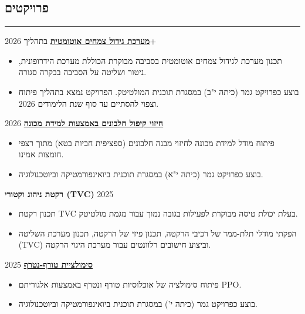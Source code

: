 \documentclass[11pt, a4paper]{article}
\begin{document}
\begin{hebrew}
\section*{פרויקטים}
\hrule \vspace{8pt}

\noindent \textbf{\href{https://drive.google.com/drive/folders/1yNS5S2wWANxv9-eX3gLDz9avkhK4RcNj?usp=sharing}{מערכת גידול צמחים אוטומטית}} \hfill בתהליך \textenglish{2026+}
\begin{itemize}[itemsep=2pt, parsep=0pt, topsep=2pt]
    \item תכנון מערכת לגידול צמחים אוטומטית בסביבה מבוקרת הכוללת מערכת הידרופונית, ניטור ושליטה על הסביבה בבקרה סגורה.
    \item בוצע כפרויקט גמר (כיתה י"ב) במסגרת תוכנית המולטיטק. הפרויקט נמצא בתהליך פיתוח וצפוי להסתיים עד סוף שנת הלימודים 2026.
\end{itemize}

\vspace{5pt}

\noindent \textbf{\href{https://github.com/dotRetrd1/Ifold}{חיזוי קיפול חלבונים באמצעות למידת מכונה}} \hfill \textenglish{2026}
\begin{itemize}[itemsep=2pt, parsep=0pt, topsep=2pt]
    \item פיתוח מודל למידת מכונה לחיזוי מבנה חלבונים (ספציפית חביות בטא) מתוך רצפי חומצות אמינו.
    \item בוצע כפרויקט גמר (כיתה י"א) במסגרת תוכנית ביואינפורמטיקה וביוטכנולוגיה.
\end{itemize}

\vspace{5pt}

\noindent \textbf{רקטת ניהוג וקטורי (\textenglish{TVC})} \hfill \textenglish{2025}
\begin{itemize}[itemsep=2pt, parsep=0pt, topsep=2pt]
    \item תכנון רקטת \textenglish{TVC} בעלת יכולת טיסה מבוקרת לפעילות בגובה נמוך עבור מגמת מולטיטק.
    \item הפקתי מודלי תלת-ממד של רכיבי הרקטה, תכנון פיזי של הרקטה, תכנון מערכת השליטה (\textenglish{TVC}) וביצוע חישובים רלוונטים עבור מערכת היגוי הרקטה.
\end{itemize}


\vspace{5pt}

\noindent \textbf{\href{https://github.com/dotRetrd1/BioCode_10th_FinalProject_PredatorVsPrey}{סימולציית טורף-נטרף}} \hfill \textenglish{2025}
\begin{itemize}[itemsep=2pt, parsep=0pt, topsep=2pt]
    \item פיתוח סימולציה של אוכלוסיות טורף ונטרף באמצעות אלגוריתם \textenglish{PPO}.
    \item בוצע כפרויקט גמר (כיתה י') במסגרת תוכנית ביואינפורמטיקה וביוטכנולוגיה.
\end{itemize}


\end{hebrew}
\end{document}
